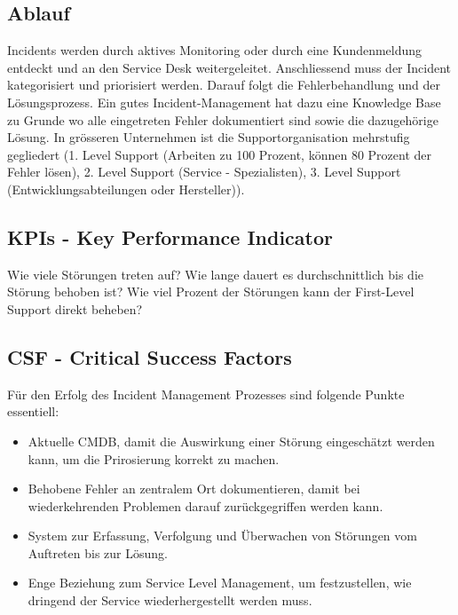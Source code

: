 \subsection{Ablauf}
Incidents werden durch aktives Monitoring oder durch eine Kundenmeldung entdeckt und an den Service Desk weitergeleitet. Anschliessend muss der Incident kategorisiert und priorisiert werden. Darauf folgt die Fehlerbehandlung und der Lösungsprozess. Ein gutes Incident-Management hat dazu eine Knowledge Base zu Grunde wo alle eingetreten Fehler dokumentiert sind sowie die dazugehörige Lösung. In grösseren Unternehmen ist die Supportorganisation mehrstufig gegliedert (1. Level Support (Arbeiten zu 100 Prozent, können 80 Prozent der Fehler lösen), 2. Level Support (Service - Spezialisten), 3. Level Support (Entwicklungsabteilungen oder Hersteller)).
\subsection{KPIs - Key Performance Indicator}
Wie viele Störungen treten auf? Wie lange dauert es durchschnittlich bis die Störung behoben ist? Wie viel Prozent der Störungen kann der First-Level Support direkt beheben?
\subsection{CSF - Critical Success Factors}
Für den Erfolg des Incident Management Prozesses sind folgende Punkte essentiell:
\begin{itemize}
	\item Aktuelle CMDB, damit die Auswirkung einer Störung eingeschätzt werden kann, um die Prirosierung korrekt zu machen.
	\item Behobene Fehler an zentralem Ort dokumentieren, damit bei wiederkehrenden Problemen darauf zurückgegriffen werden kann.
	\item System zur Erfassung, Verfolgung und Überwachen von Störungen vom Auftreten bis zur Lösung.
	\item Enge Beziehung zum Service Level Management, um festzustellen, wie dringend der Service wiederhergestellt werden muss.
\end{itemize}
